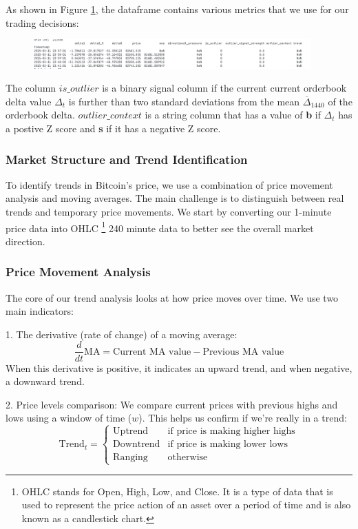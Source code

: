 \documentclass[12pt]{article}
\begin{document}
As shown in Figure \ref{fig:outlier_context}, the dataframe contains various metrics that we use for our trading decisions:

\begin{figure}[h]
    \centering
    \includegraphics[width=0.95\textwidth]{imgs/dataframeHead.png}
    \caption{}
    \label{fig:outlier_context}
\end{figure}


The column $is\_outlier$ is a binary signal column if the current current orderbook delta value $\Delta_t$ is further than two standard deviations from the mean $\overline{\Delta}_{1440}$ of the orderbook delta.
$outlier\_context$ is a string column that has a value of \textbf{b} if $\Delta_t$ has a postive Z score and \textbf{s} if it has a negative Z score.

\subsubsection*{Market Structure and Trend Identification}

To identify trends in Bitcoin's price, we use a combination of price movement analysis and moving averages. The main challenge is to distinguish between real trends and temporary price movements. We start by converting our 1-minute price data into OHLC \footnote{OHLC stands for Open, High, Low, and Close. It is a type of data that is used to represent the price action of an asset over a period of time and is also known as a candlestick chart.} 240 minute data to better see the overall market direction.

\subsubsection*{Price Movement Analysis}
The core of our trend analysis looks at how price moves over time. We use two main indicators:

1. The derivative (rate of change) of a moving average:
\begin{equation*}
    \frac{d}{dt}\text{MA} = \text{Current MA value} - \text{Previous MA value}
\end{equation*}
When this derivative is positive, it indicates an upward trend, and when negative, a downward trend.

2. Price levels comparison:
We compare current prices with previous highs and lows using a window of time ($w$). This helps us confirm if we're really in a trend:
\begin{equation*}
\text{Trend}_t = \begin{cases}
    \text{Uptrend} & \text{if price is making higher highs} \\
    \text{Downtrend} & \text{if price is making lower lows} \\
    \text{Ranging} & \text{otherwise}
\end{cases}
\end{equation*}
\end{document}
